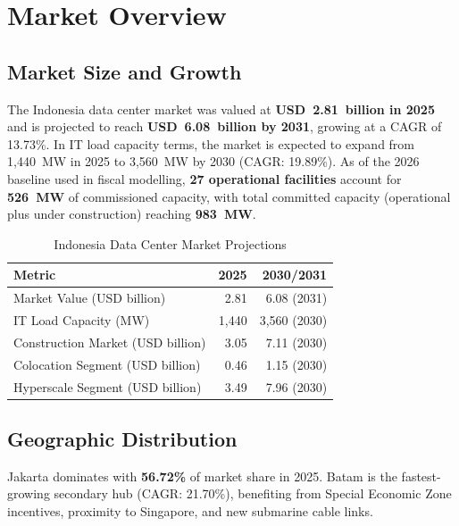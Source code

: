 \documentclass[11pt,a4paper]{article}
\begin{document}
\section{Market Overview}

\subsection{Market Size and Growth}

The Indonesia data center market was valued at \textbf{USD~2.81~billion in 2025} and is projected to reach \textbf{USD~6.08~billion by 2031}, growing at a CAGR of 13.73\%. In IT load capacity terms, the market is expected to expand from 1,440~MW in 2025 to 3,560~MW by 2030 (CAGR: 19.89\%). As of the 2026 baseline used in fiscal modelling, \textbf{27 operational facilities} account for \textbf{526~MW} of commissioned capacity, with total committed capacity (operational plus under construction) reaching \textbf{983~MW}.

\begin{table}[H]
\centering
\caption{Indonesia Data Center Market Projections}
\begin{tabular}{lrr}
\toprule
\textbf{Metric} & \textbf{2025} & \textbf{2030/2031} \\
\midrule
Market Value (USD billion)       & 2.81  & 6.08 (2031) \\
IT Load Capacity (MW)            & 1,440 & 3,560 (2030) \\
Construction Market (USD billion)& 3.05  & 7.11 (2030) \\
Colocation Segment (USD billion) & 0.46  & 1.15 (2030) \\
Hyperscale Segment (USD billion) & 3.49  & 7.96 (2030) \\
\bottomrule
\end{tabular}
\end{table}

\subsection{Geographic Distribution}

Jakarta dominates with \textbf{56.72\%} of market share in 2025. Batam is the fastest-growing secondary hub (CAGR: 21.70\%), benefiting from Special Economic Zone incentives, proximity to Singapore, and new submarine cable links.
\end{document}
